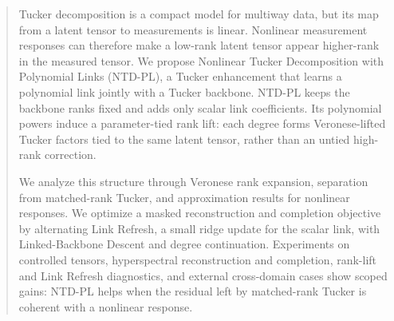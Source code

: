 \begin{abstract}
Tucker decomposition is a compact model for multiway data, but its map from a
latent tensor to measurements is linear. Nonlinear measurement responses can
therefore make a low-rank latent tensor appear higher-rank in the measured
tensor. We propose Nonlinear Tucker Decomposition with Polynomial Links
(NTD-PL), a Tucker enhancement that learns a polynomial link jointly
with a Tucker backbone. NTD-PL
keeps the backbone ranks fixed and adds only scalar link coefficients. Its
polynomial powers induce a parameter-tied rank lift: each degree forms
Veronese-lifted Tucker factors tied to the same latent tensor, rather than an
untied high-rank correction.

We analyze this structure through Veronese rank expansion, separation from
matched-rank Tucker, and approximation results for nonlinear responses.
We optimize a masked reconstruction and completion objective
by alternating Link Refresh, a small ridge update for the scalar link, with
Linked-Backbone Descent and degree continuation. Experiments on controlled
tensors, hyperspectral reconstruction and completion, rank-lift and Link
Refresh diagnostics, and external cross-domain cases show scoped gains:
NTD-PL helps when the residual left by matched-rank Tucker is coherent with a
nonlinear response.
\end{abstract}
